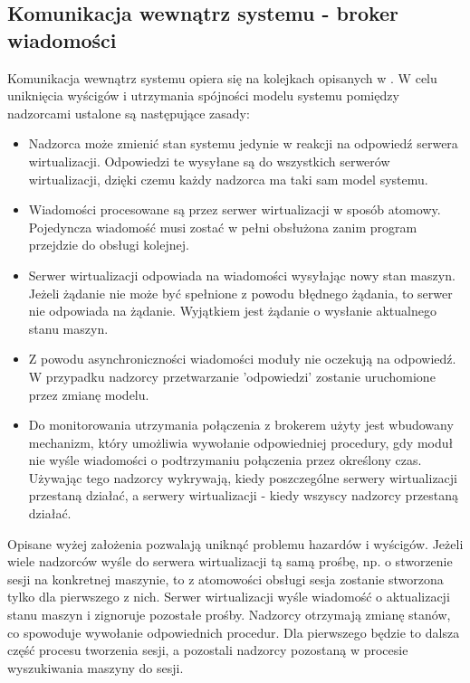 \documentclass[../../deliverable-two.tex]{subfiles}
\begin{document}
\subsection{Komunikacja wewnątrz systemu - broker wiadomości}

Komunikacja wewnątrz systemu opiera się na kolejkach opisanych w . W celu uniknięcia wyścigów i utrzymania spójności modelu systemu pomiędzy nadzorcami ustalone są następujące zasady:
\begin{itemize}
    \item Nadzorca może zmienić stan systemu jedynie w reakcji na odpowiedź serwera wirtualizacji. Odpowiedzi te wysyłane są do wszystkich serwerów wirtualizacji, dzięki czemu każdy nadzorca ma taki sam model systemu.
    \item Wiadomości procesowane są przez serwer wirtualizacji w sposób atomowy. Pojedyncza wiadomość musi zostać w pełni obsłużona zanim program przejdzie do obsługi kolejnej.
    \item Serwer wirtualizacji odpowiada na wiadomości wysyłając nowy stan maszyn. Jeżeli żądanie nie może być spełnione z powodu błędnego żądania, to serwer nie odpowiada na żądanie. Wyjątkiem jest żądanie o wysłanie aktualnego stanu maszyn.
    \item Z powodu asynchroniczności wiadomości moduły nie oczekują na odpowiedź. W przypadku nadzorcy przetwarzanie 'odpowiedzi' zostanie uruchomione przez zmianę modelu.
    \item Do monitorowania utrzymania połączenia z brokerem użyty jest wbudowany mechanizm, który umożliwia wywołanie odpowiedniej procedury, gdy moduł nie wyśle wiadomości o podtrzymaniu połączenia przez określony czas. Używając tego nadzorcy wykrywają, kiedy poszczególne serwery wirtualizacji przestaną działać, a serwery wirtualizacji - kiedy wszyscy nadzorcy przestaną działać.
\end{itemize}

Opisane wyżej założenia pozwalają uniknąć problemu hazardów i wyścigów. Jeżeli wiele nadzorców wyśle do serwera wirtualizacji tą samą prośbę, np. o stworzenie sesji na konkretnej maszynie, to z atomowości obsługi sesja zostanie stworzona tylko dla pierwszego z nich. Serwer wirtualizacji wyśle wiadomość o aktualizacji stanu maszyn i zignoruje pozostałe prośby. Nadzorcy otrzymają zmianę stanów, co spowoduje wywołanie odpowiednich procedur. Dla pierwszego będzie to dalsza część procesu tworzenia sesji, a pozostali nadzorcy pozostaną w procesie wyszukiwania maszyny do sesji.
\end{document}
